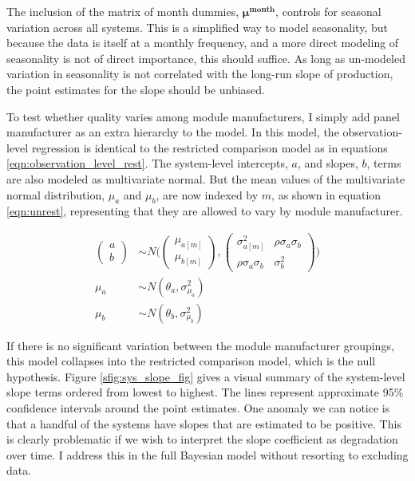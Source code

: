 \documentclass[a4paper]{article}
\begin{document}
The inclusion of the matrix of month dummies, $\mathbf{\mu^{month}}$, controls for seasonal variation across all systems. This is a simplified way to model seasonality, but because the data is itself at a monthly frequency, and a more direct modeling of seasonality is not of direct importance, this should suffice. As long as un-modeled variation in seasonality is not correlated with the long-run slope of production, the point estimates for the slope should be unbiased.

To test whether quality varies among module manufacturers, I simply add panel manufacturer as an extra hierarchy to the model. In this model, the observation-level regression is identical to the restricted comparison model as in equations \ref{eqn:observation_level_rest}. The system-level intercepts, $a$, and slopes, $b$, terms are also modeled as multivariate normal. But the mean values of the multivariate normal distribution, $\mu_a$ and $\mu_b$, are now indexed by $m$, as shown in equation \ref{eqn:unrest}, representing that they are allowed to vary by module manufacturer.

\begin{equation}
\begin{aligned}
\begin{pmatrix}
  a\\
  b
\end{pmatrix}
&\sim N \Bigg(
\begin{pmatrix}
  \mu_{a[m]}\\
  \mu_{b[m]}
\end{pmatrix},
\begin{pmatrix}
  \sigma_{a[m]}^2 & \rho \sigma_{a} \sigma_{b} \\
  \rho \sigma_a \sigma_b & \sigma_b^2
\end{pmatrix} \Bigg) \\
\mu_{a} &\sim N(\theta_a, \sigma_{\mu_a}^2) \\
\mu_{b} & \sim N(\theta_b, \sigma_{\mu_b}^2) \label{eqn:unrest}
\end{aligned}
\end{equation}

If there is no significant variation between the module manufacturer groupings, this model collapses into the restricted comparison model, which is the null hypothesis. Figure \ref{sfig:sys_slope_fig} gives a visual summary of the system-level slope terms ordered from lowest to highest. The lines represent approximate 95\% confidence intervals around the point estimates. One anomaly we can notice is that a handful of the systems have slopes that are estimated to be positive. This is clearly problematic if we wish to interpret the slope coefficient as degradation over time. I address this in the full Bayesian model without resorting to excluding data.
\end{document}
